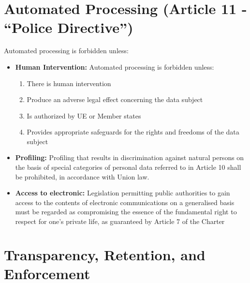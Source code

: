 \section{Automated Processing (Article 11 - “Police Directive”)}

Automated processing is forbidden unless:
\begin{itemize}[itemsep=0pt]
    \item \textbf{Human Intervention:} Automated processing is forbidden unless:
    \begin{enumerate}[itemsep=0pt,  label=\roman*.]
        \item There is human intervention
        \item Produce an adverse legal effect concerning the data subject
        \item Is authorized by UE or Member states
        \item Provides appropriate safeguards for the rights and freedoms of the data subject
    \end{enumerate}
    \item \textbf{Profiling:} Profiling that results in discrimination against natural persons on the basis of special categories of personal data referred to in Article 10 shall be prohibited, in accordance with Union law.
    
    \item \textbf{Access to electronic:} Legislation permitting public authorities to gain access to the contents of electronic communications on a generalised basis must be regarded as compromising the essence of the fundamental right to respect for one’s private life, as guaranteed by Article 7 of the Charter
\end{itemize}

\section{Transparency, Retention, and Enforcement}

